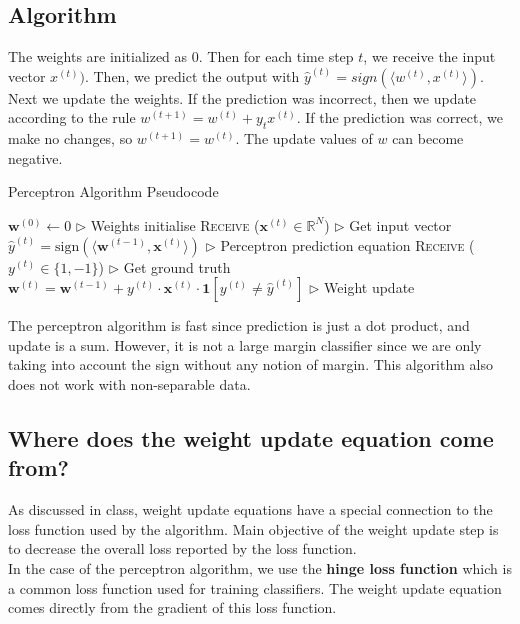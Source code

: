 \documentclass[11pt]{article}
\begin{document}
\subsection{Algorithm}
The weights are initialized as 0. Then for each time step $t$, we receive the input vector $x^{(t)})$. Then, we predict the output with $\hat{y}^{(t)} = sign(\langle w^{(t)}, x^{(t)} \rangle)$. Next we update the weights. If the prediction was incorrect, then we update according to the rule $w^{(t+1)} = w^{(t)} + y_t x^{(t)}$. If the prediction was correct, we make no changes, so $w^{(t+1)} = w^{(t)}$. The update values of $w$ can become negative.

\begin{algorithm}[H]
\caption{Perceptron Algorithm Pseudocode}
\label{algo:perceptron}
\begin{algorithmic}[1]
\STATE $\boldsymbol{w}^{(0)} \xleftarrow{} 0 $  \hfill $\triangleright$ Weights initialise
\STATE \textsc{Receive} ($\boldsymbol{x}^{(t)} \in \mathbb{R}^N$) \hfill $\triangleright$ Get input vector
\STATE $\hat{y}^{(t)} = \text{sign} \left( \langle \boldsymbol{w}^{(t-1)}, \boldsymbol{x}^{(t)} \rangle \right)$ \hfill $\triangleright$ Perceptron prediction equation
\STATE \textsc{Receive} ($y^{(t)}\in \{1,-1\}$) \hfill $\triangleright$ Get ground truth
\STATE $\boldsymbol{w}^{(t)} = \boldsymbol{w}^{(t-1)} + y^{(t)} \cdot \boldsymbol{x}^{(t)} \cdot \boldsymbol{1}[y^{(t)}\neq\hat{y}^{(t)}] $ \hfill $\triangleright$ Weight update
\ENDFOR
\end{algorithmic}
\end{algorithm}

The perceptron algorithm is fast since prediction is just a dot product, and update is a sum. However, it is not a large margin classifier since we are only taking into account the sign without any notion of margin. This algorithm also does not work with non-separable data.\\

\subsection{Where does the weight update equation come from?}
As discussed in class, weight update equations have a special connection to the loss function used by the algorithm. Main objective of the weight update step is to decrease the overall loss reported by the loss function. \\
In the case of the perceptron algorithm, we use the \textbf{hinge loss function} which is a common loss function used for training classifiers. The weight update equation comes directly from the gradient of this loss function.
\end{document}
